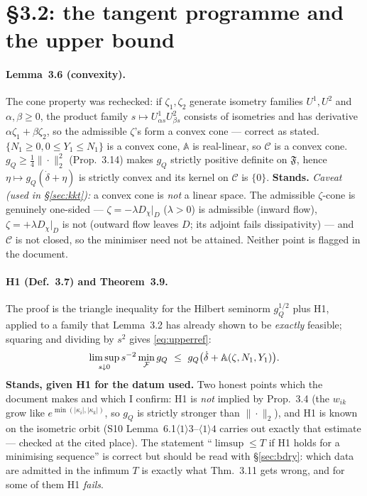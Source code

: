 \documentclass[11pt]{article}
\newcommand{\Aop}{\mathbb A}
\begin{document}
\section{\S3.2: the tangent programme and the upper bound}\label{sec:tangent}

\paragraph{Lemma~3.6 (convexity).}  The cone property was rechecked: if $\zeta_1,\zeta_2$
generate isometry families $U^1,U^2$ and $\alpha,\beta\ge0$, the product family
$s\mapsto U^1_{\alpha s}U^2_{\beta s}$ consists of isometries and has derivative
$\alpha\zeta_1+\beta\zeta_2$, so the admissible $\zeta$'s form a convex cone --- correct as
stated.  $\{N_1\ge0,0\le Y_1\le N_1\}$ is a convex cone, $\Aop$ is real-linear, so
$\mathcal C$ is a convex cone.  $g_Q\ge\frac14\|\cdot\|_2^2$ (Prop.~3.14) makes $g_Q$
strictly positive definite on $\mathfrak F$, hence $\eta\mapsto g_Q(\dot\delta+\eta)$ is
strictly convex and its kernel on $\mathcal C$ is $\{0\}$.  \textbf{Stands.}
\emph{Caveat (used in \S\ref{sec:kkt}):} a convex cone is \emph{not} a linear space.  The
admissible $\zeta$-cone is genuinely one-sided --- $\zeta=-\lambda D_\chi|_D$ ($\lambda>0$)
is admissible (inward flow), $\zeta=+\lambda D_\chi|_D$ is not (outward flow leaves $D$;
its adjoint fails dissipativity) --- and $\mathcal C$ is not closed, so the minimiser need
not be attained.  Neither point is flagged in the document.

\paragraph{H1 (Def.~3.7) and Theorem~3.9.}  The proof is the triangle inequality for the
Hilbert seminorm $g_Q^{1/2}$ plus H1, applied to a family that Lemma~3.2 has already shown
to be \emph{exactly} feasible; squaring and dividing by $s^2$ gives \eqref{eq:upperref}:
\begin{equation}\label{eq:upperref}
 \limsup_{s\downarrow0}s^{-2}\min_\cF g_Q\ \le\ g_Q\bigl(\dot\delta+\Aop(\zeta,N_1,Y_1)\bigr).
\end{equation}
\textbf{Stands, given H1 for the datum used.}  Two honest points which the document makes
and which I confirm: H1 is \emph{not} implied by Prop.~3.4 (the $w_{ik}$ grow like
$e^{\min(|\kappa_i|,|\kappa_k|)}$, so $g_Q$ is strictly stronger than $\|\cdot\|_2$), and
H1 is known on the isometric orbit (S10 Lemma~6.1$\langle1\rangle3$--$\langle1\rangle4$
carries out exactly that estimate --- checked at the cited place).  The statement
``$\limsup\le T$ if H1 holds for a minimising sequence'' is correct but should be read
with \S\ref{sec:bdry}: which data are admitted in the infimum $T$ is exactly what
Thm.~3.11 gets wrong, and for some of them H1 \emph{fails}.
\end{document}
